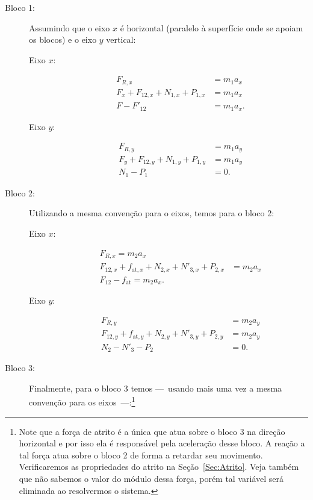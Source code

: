 \begin{description}
    \item[Bloco 1:] Assumindo que o eixo $x$ é horizontal (paralelo à superfície onde se apoiam os blocos) e o eixo $y$ vertical:
        \begin{description}
            \item[Eixo $x$:]
                \begin{align}
                    F_{R, x} &= m_1 a_x \\
                    F_x + F_{12,x} + N_{1,x} + P_{1,x} &= m_1 a_x \\
                    F - F'_{12} &= m_1 a_x.
                \end{align}
            \item[Eixo $y$:]
                \begin{align}
                    F_{R, y} &= m_1 a_y \\
                    F_y + F_{12,y} + N_{1,y} + P_{1,y} &= m_1 a_y \\
                    N_1 - P_1 &= 0.
                \end{align}
        \end{description}
    \item[Bloco 2:] Utilizando a mesma convenção para o eixos, temos para o bloco 2:
        \begin{description}
            \item[Eixo $x$:]
                \begin{align}
                    F_{R, x} = m_2 a_x \\
                    F_{12,x} + f_{\text{at},x} + N_{2,x} + N'_{3, x} + P_{2,x} &= m_2 a_x \\
                    F_{12} - f_{\text{at}} = m_2 a_x.
                \end{align}
            \item[Eixo $y$:]
                \begin{align}
                    F_{R, y} &= m_2 a_y \\
                    F_{12,y} + f_{\text{at},y} + N_{2,y} + N'_{3, y} + P_{2,y} &= m_2 a_y \\
                    N_2 - N'_3 - P_2 &= 0.
                \end{align}
        \end{description}
    \item[Bloco 3:] Finalmente, para o bloco 3 temos ---~usando mais uma vez a mesma convenção para os eixos~---:\footnote{Note que a força de atrito é a única que atua sobre o bloco 3 na direção horizontal e por isso ela é responsável pela aceleração desse bloco. A reação a tal força atua sobre o bloco 2 de forma a retardar seu movimento. Verificaremos as propriedades do atrito na Seção~\ref{Sec:Atrito}. Veja também que não sabemos o valor do módulo dessa força, porém tal variável será eliminada ao resolvermos o sistema.}

\end{description}
